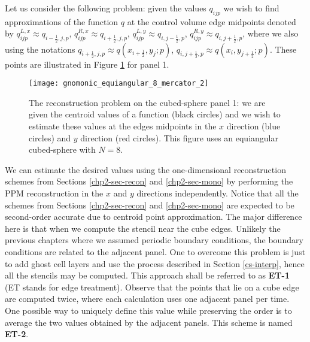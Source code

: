 Let us consider the following problem: given the values $q_{ijp}$ we wish to find approximations of 
the function $q$ at the control volume edge midpoints denoted by
$q^{L,x}_{ijp}  \approx q_{{i-\frac{1}{2}},j,p}$,
$q^{R,x}_{ijp}  \approx q_{{i+\frac{1}{2}},j,p}$,
$q^{L,y}_{ijp}  \approx q_{i,{j-\frac{1}{2}},p}$,
$q^{R,y}_{ijp}  \approx q_{i,{j+\frac{1}{2}},p}$, where we also using the notations
$q_{{i+\frac{1}{2}},j,p}  \approx q(x_{i+\frac{1}{2}},y_j; p)$,
$q_{i,{j+\frac{1}{2}},p}  \approx q(x_i,y_{j+\frac{1}{2}}; p)$.
These points are illustrated in Figure \ref{csgrid-rpoints} for panel 1.
\begin{figure}[!htb]
	\centering
	\texttt{[image: gnomonic\_equiangular\_8\_mercator\_2]}
	\caption{The reconstruction problem on the cubed-sphere panel 1: we are given the centroid values of a function (black circles)
		and we wish to estimate these values at the edges midpoints in the $x$ direction (blue circles) and $y$ direction (red circles).
		This figure uses an equiangular cubed-sphere with $N=8$.} \label{csgrid-rpoints}
\end{figure}

We can estimate the desired values using the one-dimensional reconstruction schemes from Sections \ref{chp2-sec-recon} and \ref{chp2-sec-mono}
by performing the PPM reconstruction in the $x$ and $y$ directions independently. Notice that all the schemes from 
Sections \ref{chp2-sec-recon} and \ref{chp2-sec-mono} are expected to be second-order accurate due to centroid point approximation.
The major difference here is that when we compute the stencil near the cube edges. Unlikely the previous chapters where we
assumed periodic boundary conditions, the boundary conditions are related to the adjacent panel.
One to overcome this problem is just to add ghost cell layers and use the process described in Section \ref{cs-interp}, hence
all the stencils may be computed. This approach shall be referred to as \textbf{ET-1} (ET stands for edge treatment).
Observe that the points that lie on a cube edge are computed twice, where each calculation uses one adjacent panel per time.
One possible way to uniquely define this value while preserving the order is
to average the two values obtained by the adjacent panels. This scheme is named \textbf{ET-2}.

